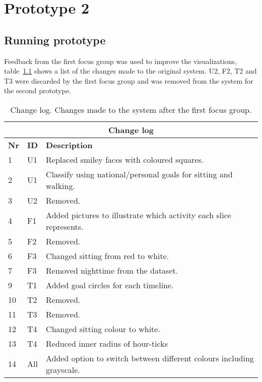 \chapter{Prototype 2}

\section{Running prototype}
Feedback from the first focus group was used to improve the visualizations, table~\ref{fig:changeLog} shows a list of the changes made to the original system. U2, F2, T2 and T3 were discarded by the first focus group and was removed from the system for the second prototype. 

\begin{table}[h!]
  \centering
  \begin{tabular}{|l|l|p{10.15cm}|}
      \multicolumn{3}{c}{\textbf{Change log}} \\ \hline
      \textbf{Nr} & \textbf{ID} & \textbf{Description} \\ \hline
      1  & U1 & Replaced smiley faces with coloured squares. \\ \hline
      2  & U1 & Classify using national/personal goals for sitting and walking.\\ \hline 
      3  & U2 & Removed. \\ \hline
      4  & F1 & Added pictures to illustrate which activity each slice represents. \\ \hline
      5  & F2 & Removed. \\ \hline 
      6  & F3 & Changed sitting from red to white. \\ \hline
      7  & F3 & Removed nighttime from the dataset. \\ \hline
      9  & T1 & Added goal circles for each timeline. \\ \hline
      10 & T2 & Removed. \\ \hline
      11 & T3 & Removed. \\ \hline
      12 & T4 & Changed sitting colour to white. \\ \hline
      13 & T4 & Reduced inner radius of hour-ticks \\ \hline
      14 & All & Added option to switch between different colours including grayscale. \\ \hline
  \end{tabular}
  \caption{Change log. Changes made to the system after the first focus group.}
  \label{fig:changeLog}
\end{table}

